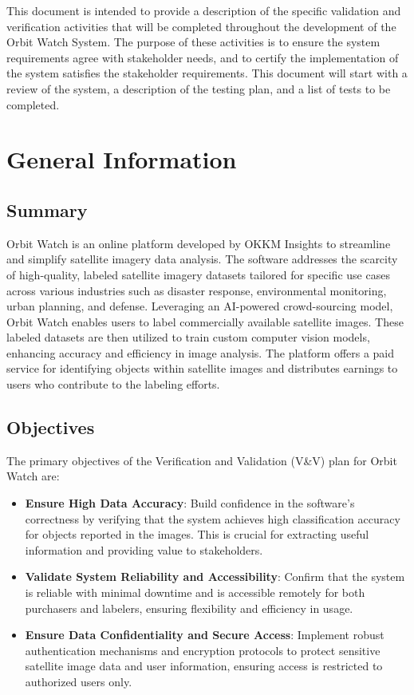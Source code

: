 \documentclass[12pt, titlepage]{article}
\begin{document}
\newpage


This document is intended to provide a description of the specific validation and verification activities that will be completed throughout the development of the Orbit Watch System.
The purpose of these activities is to ensure the system requirements agree with stakeholder needs, and to certify the implementation of the system satisfies the stakeholder requirements. This document will
start with a review of the system, a description of the testing plan, and a list of tests to be completed.


  \section{General Information}

  \subsection{Summary} \cite{Problem_Statement}
  
  Orbit Watch is an online platform developed by OKKM Insights to streamline and simplify satellite imagery data analysis. The software addresses the scarcity of high-quality, labeled satellite imagery datasets tailored for specific use cases across various industries such as disaster response, environmental monitoring, urban planning, and defense. Leveraging an AI-powered crowd-sourcing model, Orbit Watch enables users to label commercially available satellite images. These labeled datasets are then utilized to train custom computer vision models, enhancing accuracy and efficiency in image analysis. The platform offers a paid service for identifying objects within satellite images and distributes earnings to users who contribute to the labeling efforts.
  
  \subsection{Objectives} \cite{Problem_Statement}
  
  The primary objectives of the Verification and Validation (V\&V) plan for Orbit Watch are:
  
  \begin{itemize}
      \item \textbf{Ensure High Data Accuracy}: Build confidence in the software's correctness by verifying that the system achieves high classification accuracy for objects reported in the images. This is crucial for extracting useful information and providing value to stakeholders.
      \item \textbf{Validate System Reliability and Accessibility}: Confirm that the system is reliable with minimal downtime and is accessible remotely for both purchasers and labelers, ensuring flexibility and efficiency in usage.
      \item \textbf{Ensure Data Confidentiality and Secure Access}: Implement robust authentication mechanisms and encryption protocols to protect sensitive satellite image data and user information, ensuring access is restricted to authorized users only.
  \end{itemize}
  
\end{document}
